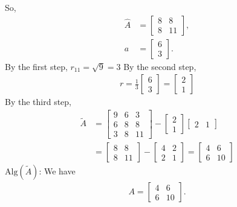 \documentclass{report}
\begin{document}
    So,
    \begin{align*}
        \hat{A} &= \begin{bmatrix} 8 & 8 \\ 8 & 11 \end{bmatrix}, \\
        a &= \begin{bmatrix} 6 \\ 3 \end{bmatrix} 
    .\end{align*}
    By the first step, $r_{11} = \sqrt{9} = 3 $
    \bigbreak \noindent 
    By the second step, 
    \begin{align*}
         r = \frac{1}{3}\begin{bmatrix} 6 \\ 3 \end{bmatrix} = \begin{bmatrix} 2 \\ 1 \end{bmatrix}
    \end{align*}
    By the third step, 
    \begin{align*}
        \tilde{A} &= \begin{bmatrix} 9 & 6  &3 \\ 6 & 8 & 8 \\ 3 & 8 & 11 \end{bmatrix} - \begin{bmatrix} 2 \\ 1 \end{bmatrix} \begin{bmatrix} 2 & 1 \end{bmatrix} \\
                  &= \begin{bmatrix}  8 & 8 \\  8 & 11 \end{bmatrix} - \begin{bmatrix} 4 & 2 \\ 2 & 1 \end{bmatrix} = \begin{bmatrix} 4 & 6 \\ 6 & 10 \end{bmatrix}
    \end{align*}
    $\text{Alg}(\tilde{A})$: We have
    \begin{align*}
        A = \begin{bmatrix}
            4 & 6 \\
            6 & 10
        \end{bmatrix}
   .\end{align*}
\end{document}

